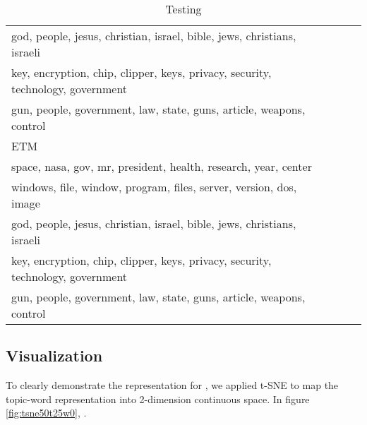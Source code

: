 \begin{table}[]
\begin{tabular}{llll}
god, people, jesus, christian, israel, bible, jews, christians, israeli\\
key, encryption, chip, clipper, keys, privacy, security, technology, government\\
gun, people, government, law, state, guns, article, weapons, control
\\ \hline
ETM  \\ \hline
space, nasa, gov, mr, president, health, research, year, center\\
windows, file, window, program, files, server, version, dos, image\\
god, people, jesus, christian, israel, bible, jews, christians, israeli\\
key, encryption, chip, clipper, keys, privacy, security, technology, government\\
gun, people, government, law, state, guns, article, weapons, control
\\ \hline
\end{tabular}
\caption{Testing}
\end{table}
\subsection{Visualization}
To clearly demonstrate the representation for , we applied t-SNE to map the topic-word representation into 2-dimension continuous space. In figure \ref{fig:tsne50t25w0}, .
